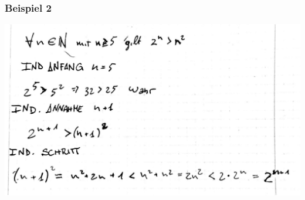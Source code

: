 \documentclass[14pt,a4paper]{article}
\begin{document}
\subsubsection{Beispiel 2}
\includegraphics[scale=0.25]{vorlagen/induktion5.jpg} 
\end{document}
